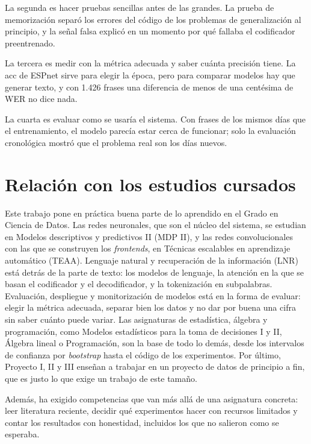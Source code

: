 La segunda es hacer pruebas sencillas antes de las grandes. La prueba de memorización separó los errores del código de los problemas de generalización al principio, y la señal falsa explicó en un momento por qué fallaba el codificador preentrenado.

La tercera es medir con la métrica adecuada y saber cuánta precisión tiene. La acc de ESPnet sirve para elegir la época, pero para comparar modelos hay que generar texto, y con 1.426 frases una diferencia de menos de una centésima de WER no dice nada.

La cuarta es evaluar como se usaría el sistema. Con frases de los mismos días que el entrenamiento, el modelo parecía estar cerca de funcionar; solo la evaluación cronológica mostró que el problema real son los días nuevos.

\section{Relación con los estudios cursados}

Este trabajo pone en práctica buena parte de lo aprendido en el Grado en Ciencia de Datos. Las redes neuronales, que son el núcleo del sistema, se estudian en Modelos descriptivos y predictivos II (MDP II), y las redes convolucionales con las que se construyen los \textit{frontends}, en Técnicas escalables en aprendizaje automático (TEAA). Lenguaje natural y recuperación de la información (LNR) está detrás de la parte de texto: los modelos de lenguaje, la atención en la que se basan el codificador y el decodificador, y la tokenización en subpalabras. Evaluación, despliegue y monitorización de modelos está en la forma de evaluar: elegir la métrica adecuada, separar bien los datos y no dar por buena una cifra sin saber cuánto puede variar. Las asignaturas de estadística, álgebra y programación, como Modelos estadísticos para la toma de decisiones I y II, Álgebra lineal o Programación, son la base de todo lo demás, desde los intervalos de confianza por \textit{bootstrap} hasta el código de los experimentos. Por último, Proyecto I, II y III enseñan a trabajar en un proyecto de datos de principio a fin, que es justo lo que exige un trabajo de este tamaño.

Además, ha exigido competencias que van más allá de una asignatura concreta: leer literatura reciente, decidir qué experimentos hacer con recursos limitados y contar los resultados con honestidad, incluidos los que no salieron como se esperaba.

